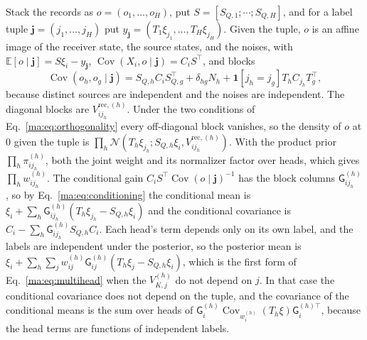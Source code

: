 \documentclass[11pt]{article}
\theoremstyle{definition}
\theoremstyle{remark}
\newcommand{\E}{\mathbb E}
\newcommand{\Gauss}{\mathcal N}
\newcommand{\G}{\mathsf G}
\newcommand{\Cov}{\operatorname{Cov}}
\begin{document}
Stack the records as $o=(o_1,\ldots,o_H)$, put $S=[S_{Q,1};\cdots;S_{Q,H}]$, and for a label tuple $\mathbf j=(j_1,\ldots,j_H)$ put $y_{\mathbf j}=(T_1\xi_{j_1},\ldots,T_H\xi_{j_H})$. Given the tuple, $o$ is an affine image of the receiver state, the source states, and the noises, with $\E[o\mid\mathbf j]=S\xi_i-y_{\mathbf j}$, $\Cov(X_i,o\mid\mathbf j)=C_iS^\top$, and blocks
\[
\Cov(o_h,o_g\mid\mathbf j)=S_{Q,h}C_iS_{Q,g}^\top+\delta_{hg}N_h+\mathbf 1[j_h=j_g]T_hC_{j_h}T_g^\top,
\]
because distinct sources are independent and the noises are independent. The diagonal blocks are $V^{\mathrm{rec},(h)}_{ij_h}$. Under the two conditions of Eq.~\eqref{ma:eq:orthogonality} every off-diagonal block vanishes, so the density of $o$ at $0$ given the tuple is $\prod_h\Gauss(T_h\xi_{j_h};S_{Q,h}\xi_i,V^{\mathrm{rec},(h)}_{ij_h})$. With the product prior $\prod_h\pi^{(h)}_{ij_h}$, both the joint weight and its normalizer factor over heads, which gives $\prod_hw^{(h)}_{ij_h}$. The conditional gain $C_iS^\top\Cov(o\mid\mathbf j)^{-1}$ has the block columns $\G^{(h)}_{ij_h}$, so by Eq.~\eqref{ma:eq:conditioning} the conditional mean is $\xi_i+\sum_h\G^{(h)}_{ij_h}(T_h\xi_{j_h}-S_{Q,h}\xi_i)$ and the conditional covariance is $C_i-\sum_h\G^{(h)}_{ij_h}S_{Q,h}C_i$. Each head's term depends only on its own label, and the labels are independent under the posterior, so the posterior mean is $\xi_i+\sum_h\sum_jw^{(h)}_{ij}\G^{(h)}_{ij}(T_h\xi_j-S_{Q,h}\xi_i)$, which is the first form of Eq.~\eqref{ma:eq:multihead} when the $V^{(h)}_{K,j}$ do not depend on $j$. In that case the conditional covariance does not depend on the tuple, and the covariance of the conditional means is the sum over heads of $\G^{(h)}_i\Cov_{w^{(h)}_i}(T_h\xi)\G^{(h)\top}_i$, because the head terms are functions of independent labels.
\end{document}
